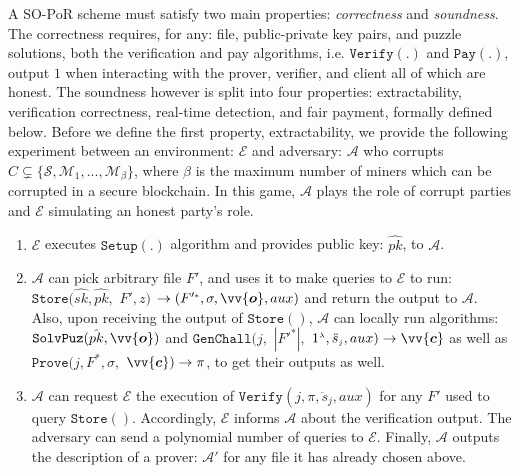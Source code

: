 %
%




  
A SO-PoR scheme must satisfy two main properties: \emph{correctness} and \emph{soundness}. The correctness requires, for any: file, public-private key pairs, and puzzle solutions, both the verification  and pay algorithms, i.e. $\mathtt{Verify}(.)$ and $\mathtt{Pay}(.)$, output $1$ when interacting with  the  prover, verifier, and client  all of which are honest.  The soundness however is split into four properties: extractability, verification correctness, real-time detection, and fair payment, formally defined below.  Before we define the first property,  extractability, we provide the following  experiment between an environment: $\mathcal{E}$ and  adversary: $\mathcal{A}$ who corrupts $C\subsetneq\{\mathcal{S},\mathcal{M}_{\scriptscriptstyle 1},...,\mathcal{M}_{\scriptscriptstyle\beta}\}$, where $\beta$ is the maximum number of miners which can be corrupted in a secure blockchain. In this game, $\mathcal{A}$ plays the role of corrupt parties and $\mathcal{E}$ simulating an honest party's role. 


\begin{enumerate}
\item $\mathcal{E}$ executes $\mathtt{Setup}(.)$ algorithm and provides public key: $\hat{pk}$, to $\mathcal{A}$.   
\item $\mathcal{A}$ can pick  arbitrary file $F'$, and  uses it to make queries to  $\mathcal{E}$ to run:  $\mathtt{Store}(\hat{sk},\hat{pk},$ $ F',z)$ $\rightarrow (F'^{\scriptscriptstyle *}, \sigma, \vv{\bm{o}},aux)$  and return the output to $\mathcal{A}$. Also, upon receiving the output of $\mathtt{Store}()$, $\mathcal{A}$ can locally run  algorithms: $\mathtt {SolvPuz}(\hat{pk},\vv{\bm{o}})$ and   $\mathtt{GenChall}(j,$ $|F'^{\scriptscriptstyle *}|, $ $ 1^{\scriptscriptstyle\lambda},\ddot{s}_{\scriptscriptstyle j},aux)\rightarrow \vv{\bm{c}}$ as well as  $\mathtt{Prove}(j,F^{\scriptscriptstyle *}, \sigma, $ $ \vv{\bm{c}})\rightarrow \pi$,  to get their outputs as well. 
\item $\mathcal{A}$ can request $\mathcal{E}$ the execution of $\mathtt{Verify}(j,\pi,\ddot{s}_{\scriptscriptstyle j},aux)$ for any $F'$ used to query $\mathtt{Store}()$. Accordingly, $\mathcal{E}$ informs  $\mathcal{A}$ about the verification output. The adversary can send a polynomial number of queries to $\mathcal{E}$. Finally, $\mathcal{A}$ outputs the description of a prover: $\mathcal{A}'$ for any file it has already chosen above. 
\end{enumerate}

